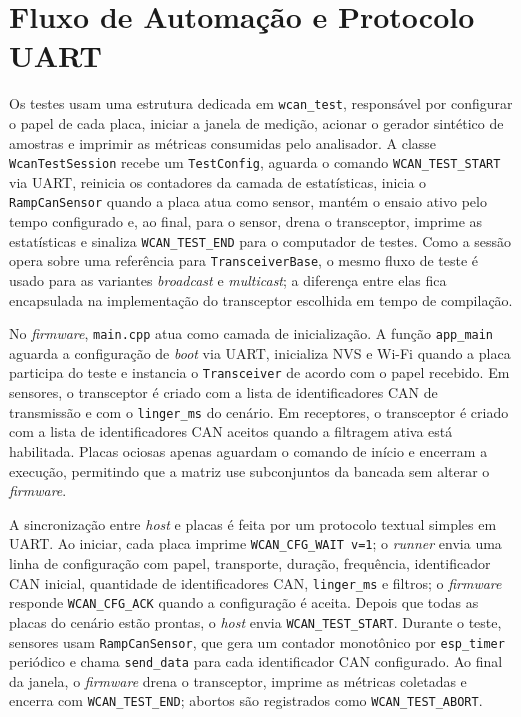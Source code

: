 \section{Fluxo de Automação e Protocolo UART}

Os testes usam uma estrutura dedicada em \texttt{wcan\_test}, responsável por
configurar o papel de cada placa, iniciar a janela de medição, acionar o gerador
sintético de amostras e imprimir as métricas consumidas pelo analisador. A classe
\texttt{WcanTestSession} recebe um \texttt{TestConfig}, aguarda o comando
\texttt{WCAN\_TEST\_START} via UART, reinicia os contadores da camada de
estatísticas, inicia o \texttt{RampCanSensor} quando a placa atua como sensor,
mantém o ensaio ativo pelo tempo configurado e, ao final, para o sensor, drena o
transceptor, imprime as estatísticas e sinaliza \texttt{WCAN\_TEST\_END} para o
computador de testes. Como a sessão opera sobre uma referência para
\texttt{TransceiverBase}, o mesmo fluxo de teste é usado para as variantes
\emph{broadcast} e \emph{multicast}; a diferença entre elas fica encapsulada na
implementação do transceptor escolhida em tempo de compilação.

No \emph{firmware}, \texttt{main.cpp} atua como camada de inicialização. A função
\texttt{app\_main} aguarda a configuração de \emph{boot} via UART, inicializa NVS
e Wi-Fi quando a placa participa do teste e instancia o \texttt{Transceiver} de
acordo com o papel recebido. Em sensores, o transceptor é criado com a lista de
identificadores CAN de transmissão e com o \texttt{linger\_ms} do cenário. Em
receptores, o transceptor é criado com a lista de identificadores CAN aceitos
quando a filtragem ativa está habilitada. Placas ociosas apenas aguardam o
comando de início e encerram a execução, permitindo que a matriz use subconjuntos
da bancada sem alterar o \emph{firmware}.

A sincronização entre \emph{host} e placas é feita por um protocolo textual
simples em UART. Ao iniciar, cada placa imprime \texttt{WCAN\_CFG\_WAIT v=1}; o
\emph{runner} envia uma linha de configuração com papel, transporte, duração,
frequência, identificador CAN inicial, quantidade de identificadores CAN,
\texttt{linger\_ms} e filtros; o \emph{firmware} responde
\texttt{WCAN\_CFG\_ACK} quando a configuração é aceita. Depois que todas as
placas do cenário estão prontas, o \emph{host} envia \texttt{WCAN\_TEST\_START}.
Durante o teste, sensores usam \texttt{RampCanSensor}, que gera um contador
monotônico por \texttt{esp\_timer} periódico e chama \texttt{send\_data} para
cada identificador CAN configurado. Ao final da janela, o \emph{firmware} drena
o transceptor, imprime as métricas coletadas e encerra com
\texttt{WCAN\_TEST\_END}; abortos são registrados como
\texttt{WCAN\_TEST\_ABORT}.


